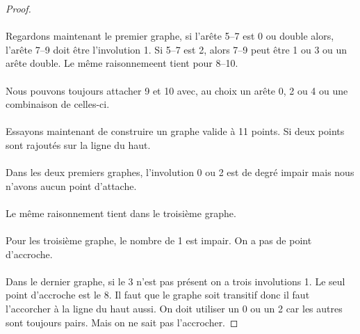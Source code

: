 \begin{proof}
\begin{center}
  \end{center}

  \paragraph{}
  Regardons maintenant le premier graphe, si l'arête 5--7 est 0 ou double alors, l'arête 7--9 doit être l'involution 1. Si 5--7 est 2, alors 7--9 peut être 1 ou 3 ou un arête double. Le même raisonnemeent tient pour 8--10.

  \paragraph{}
  Nous pouvons toujours attacher 9 et 10 avec, au choix un arête 0, 2 ou 4 ou une combinaison de celles-ci.


  \paragraph{}
  Essayons maintenant de construire un graphe valide à 11 points. Si deux points sont rajoutés sur la ligne du haut.

  \paragraph{}
  Dans les deux premiers graphes, l'involution 0 ou 2 est de degré impair mais nous n'avons aucun point d'attache.

  \paragraph{}
  Le même raisonnement tient dans le troisième graphe.

  \paragraph{}
  Pour les troisième graphe, le nombre de 1 est impair. On a pas de point d'accroche.

  \paragraph{}
  Dans le dernier graphe, si le 3 n'est pas présent on a trois involutions 1. Le seul point d'accroche est le 8. Il faut que le graphe soit transitif donc il faut l'accorcher à la ligne du haut aussi. On doit utiliser un 0 ou un 2 car les autres sont toujours pairs. Mais on ne sait pas l'accrocher.


\end{proof}

